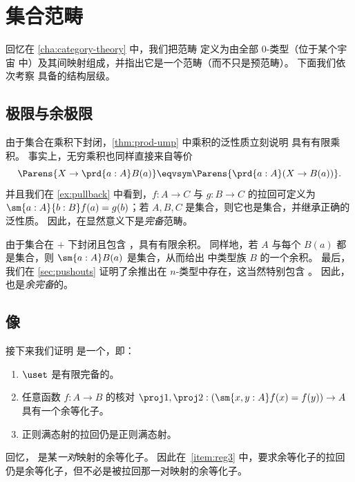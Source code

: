 \section{集合范畴}
\label{sec:piw-pretopos}

回忆在 \cref{cha:category-theory} 中，我们把范畴 \uset 定义为由全部 $0$-类型（位于某个宇宙 \UU 中）及其间映射组成，并指出它是一个范畴（而不只是预范畴）。
下面我们依次考察 \uset 具备的结构层级。

\subsection{极限与余极限}
\label{subsec:limits-sets}

%
%

由于集合在乘积下封闭，\cref{thm:prod-ump} 中乘积的泛性质立刻说明 \uset 具有有限乘积。
事实上，无穷乘积也同样直接来自等价
\[ \Parens{X\to \prd{a:A} B(a)} \eqvsym \Parens{\prd{a:A} (X\to B(a))}.\]
并且我们在 \cref{ex:pullback} 中看到，$f:A\to C$ 与 $g:B\to C$ 的拉回可定义为 $\sm{a:A}{b:B} f(a)=g(b)$；若 $A,B,C$ 是集合，则它也是集合，并继承正确的泛性质。
因此，\uset 在显然意义下是\emph{完备}范畴。
%
%

由于集合在 $+$ 下封闭且包含 \emptyt，\uset 具有有限余积。
同样地，若 $A$ 与每个 $B(a)$ 都是集合，则 $\sm{a:A}B(a)$ 是集合，从而给出 \uset 中类型族 $B$ 的一个余积。
最后，我们在 \cref{sec:pushouts} 证明了余推出在 $n$-类型中存在，这当然特别包含 \uset。
因此，\uset 也是\emph{余完备}的。
%
%

\subsection{像}
\label{sec:image}

接下来我们证明 \uset 是一个，即：
%
%
%
\begin{enumerate}
\item $\uset$ 是有限完备的。\label{item:reg1}
\item 任意函数 $f : A \to B$ 的核对 $\proj1,\proj2: (\sm{x,y:A} f(x)= f(y)) \to A$
  具有一个余等化子。\label{item:reg2}
\item 正则满态射的拉回仍是正则满态射。\label{item:reg3}
\end{enumerate}
%
回忆，
%
%
是某\emph{一对}映射的余等化子。
因此在~\ref{item:reg3} 中，要求余等化子的拉回仍是余等化子，但不必是被拉回那一对映射的余等化子。

